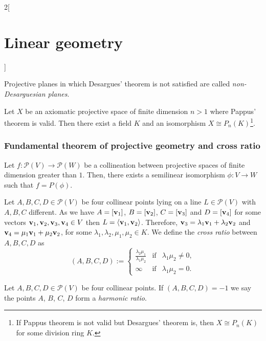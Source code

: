 \documentclass[../../../main.tex]{subfiles}
\begin{document}
\begin{multicols}{2}[\section{Linear geometry}]
\begin{definition}
\begin{itemize}
    \end{itemize}
  \end{definition}
  \begin{definition}
    Projective planes in which Desargues' theorem is not satisfied are called \emph{non-Desarguesian planes}.
  \end{definition}
  \begin{theorem}
    Let $X$ be an axiomatic projective space of finite dimension $n>1$ where Pappus' theorem is valid. Then there exist a field $K$ and an isomorphism $X\cong P_n(K)$\footnote{If Pappus theorem is not valid but Desargues' theorem is, then $X\cong P_n(K)$ for some division ring $K$.}.
  \end{theorem}
  \subsubsection{Fundamental theorem of projective geometry and cross ratio}
  \begin{theorem}
    Let $f:\mathcal{P}(V)\rightarrow \mathcal{P}(W)$ be a collineation between projective spaces of finite dimension greater than $1$. Then, there exists a semilinear isomorphism $\phi:V\rightarrow W$ such that $f=P(\phi)$.
  \end{theorem}
  \begin{definition}
    Let $A,B,C,D\in\mathcal{P}(V)$ be four collinear points lying on a line $L\in\mathcal{P}(V)$ with $A,B,C$ different. As we have $A=[\boldsymbol{\mathrm{v}}_1]$, $B=[\boldsymbol{\mathrm{v}}_2]$, $C=[\boldsymbol{\mathrm{v}}_3]$ and $D=[\boldsymbol{\mathrm{v}}_4]$ for some vectors $\boldsymbol{\mathrm{v}}_1,\boldsymbol{\mathrm{v}}_2,\boldsymbol{\mathrm{v}}_3,\boldsymbol{\mathrm{v}}_4\in V$ then $L=\langle \boldsymbol{\mathrm{v}}_1,\boldsymbol{\mathrm{v}}_2\rangle$. Therefore, $\boldsymbol{\mathrm{v}}_3=\lambda_1\boldsymbol{\mathrm{v}}_1+\lambda_2\boldsymbol{\mathrm{v}}_2$ and $\boldsymbol{\mathrm{v}}_4=\mu_1\boldsymbol{\mathrm{v}}_1+\mu_2\boldsymbol{\mathrm{v}}_2$, for some $\lambda_1,\lambda_2,\mu_1,\mu_2\in K$. We define the \emph{cross ratio} between $A,B,C,D$ as $$(A,B,C,D):=\left\{
      \begin{array}{ccc}
        \displaystyle\frac{\lambda_2\mu_1}{\lambda_1\mu_2} & \text{if} & \lambda_1\mu_2\ne0, \\
        \infty                                             & \text{if} & \lambda_1\mu_2=0.
      \end{array}\right.$$
  \end{definition}
  \begin{definition}
    Let $A,B,C,D\in\mathcal{P}(V)$ be four collinear points. If $(A,B,C,D)=-1$ we say the points $A$, $B$, $C$, $D$ form a \emph{harmonic ratio}.

\end{definition}
\end{multicols}
\end{document}
